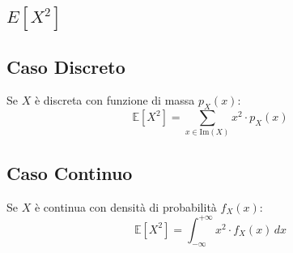 \documentclass{article}
\begin{document}
\subsection*{${E}[X^2]$}

\subsection*{Caso Discreto}
Se $X$ è discreta con funzione di massa $p_X(x)$:
\[
\mathbb{E}[X^2] = \sum_{x \in \text{Im}(X)} x^2 \cdot p_X(x)
\]

\subsection*{Caso Continuo}
Se $X$ è continua con densità di probabilità $f_X(x)$:
\[
\mathbb{E}[X^2] = \int_{-\infty}^{+\infty} x^2 \cdot f_X(x) \, dx
\]
\end{document}
